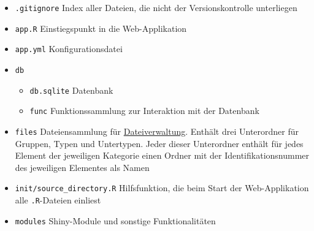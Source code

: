 \documentclass[
]{article}
\providecommand{\tightlist}{%
  \setlength{\itemsep}{0pt}\setlength{\parskip}{0pt}}
\begin{document}
\begin{itemize}
\tightlist
\item
  \texttt{.gitignore} Index aller Dateien, die nicht der Versionskontrolle unterliegen
\item
  \texttt{app.R} Einstiegspunkt in die Web-Applikation
\item
  \texttt{app.yml} Konfigurationsdatei
\item
  \texttt{db}

  \begin{itemize}
  \tightlist
  \item
    \texttt{db.sqlite} Datenbank
  \item
    \texttt{func} Funktionssammlung zur Interaktion mit der Datenbank
  \end{itemize}
\item
  \texttt{files} Dateiensammlung für \protect\hyperlink{file-management}{Dateiverwaltung}. Enthält drei Unterordner für Gruppen, Typen und Untertypen. Jeder dieser Unterordner enthält für jedes Element der jeweiligen Kategorie einen Ordner mit der Identifikationsnummer des jeweiligen Elementes als Namen
\item
  \texttt{init/source\_directory.R} Hilfsfunktion, die beim Start der Web-Applikation alle \texttt{.R}-Dateien einliest
\item
  \texttt{modules} Shiny-Module und sonstige Funktionalitäten


\end{itemize}
\end{document}
